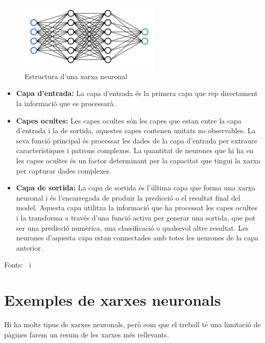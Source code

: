 \begin{figure}[h!]
    \centering
    \includegraphics[width=0.6\textwidth]{./figures/xarxa.png}
    \caption{Estructura d'una xarxa neuronal~\cite{Img_estructura}}
\end{figure}

\begin{itemize}

    \item \textbf{Capa d'entrada: } La capa d'entrada és la primera capa que rep directament la informació que es processarà.
\clearpage
    \item \textbf{Capes ocultes: } Les capes ocultes són les capes que estan entre la capa d'entrada i la de sortida, aquestes capes contenen unitats no observables. La seva funció principal és processar les dades de la capa d'entrada per extraure característiques i patrons complexos. La quantitat de neurones que hi ha en les capes ocultes és un factor determinant per la capacitat que tingui la xarxa per capturar dades complexes.

    \item \textbf{Capa de sortida: } La capa de sortida és l'última capa que forma una xarxa neuronal i és l'encarregada de produir la predicció o el resultat final del model. Aquesta capa utilitza la informació que ha processat les capes ocultes i la transforma a través d'una funció activa per generar una sortida, que pot ser una predicció numèrica, una classificació o qualsevol altre resultat. Les neurones d'aquesta capa estan connectades amb totes les neurones de la capa anterior.

\end{itemize}

Fonts:~\cite{Hidden_layer} i~\cite{linkedin}

\section{Exemples de xarxes neuronals}

Hi ha molts tipus de xarxes neuronals, però com que el treball té una limitació de pàgines farem un resum de les xarxes més rellevants.

